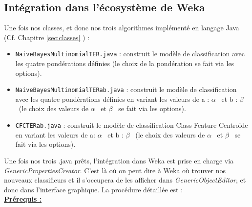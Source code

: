 \documentclass{article}
\begin{document}
\subsection{Intégration dans l'écosystème de Weka}
Une fois nos classes, et donc nos trois algorithmes implémenté en langage Java (Cf. Chapitre \ref{sec:classes} ) :
\begin{itemize}
\item  \texttt{NaiveBayesMultinomialTER.java} : construit le modèle de classification avec les quatre pondérations définies (le choix de la pondération se fait via les options).
\item  \texttt{NaiveBayesMultinomialTERab.java} : construit le modèle de classification avec les quatre pondérations définies en variant les valeurs de a : $\alpha$ \ et b : $\beta$ \ (le choix des valeurs de $\alpha$ \ et $\beta$ \ se fait via les options).
\item  \texttt{CFCTERab.java} : construit le modèle de classification Class-Feature-Centroide en variant les valeurs de a: $\alpha$ \ et b : $\beta$ \ (le choix des valeurs de $\alpha$ \ et $\beta$ \ se fait via les options).
\end{itemize}
Une fois nos trois .java prêts, l'intégration dans Weka est prise en charge via  \textit{GenericPropertiesCreator}. C'est là où on peut dire à Weka où trouver nos nouveaux classifieurs et il s'occupera de les afficher dans  \textit{GenericObjectEditor}, et donc dans l'interface graphique. La procédure détaillée est : \\
\textbf{\underline{Prérequis :}}
\end{document}

